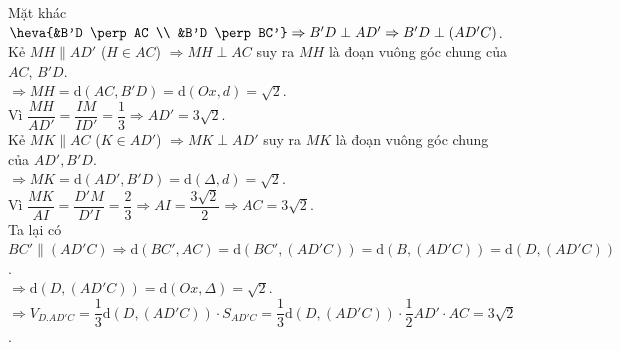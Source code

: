 \begin{ex}
{		Mặt khác $\heva{&B'D \perp AC \\ &B'D \perp BC'} \Rightarrow B'D \perp AD' \Rightarrow B'D  \perp (AD'C)$.\\
		Kẻ $MH \parallel AD'$ ($H \in AC$) $\Rightarrow MH \perp AC$ suy ra $MH$ là đoạn vuông góc chung của $AC$, $B'D$.\\ $\Rightarrow MH =  \mathrm{d}(AC, B'D) = \mathrm{d}(Ox, d) = \sqrt{2}$.\\
		Vì $\dfrac{MH}{AD'} = \dfrac{IM}{ID'} =  \dfrac{1}{3} \Rightarrow AD' = 3\sqrt{2}$.\\
		Kẻ $MK \parallel AC$  ($K \in AD'$) $\Rightarrow MK \perp AD'$ suy ra $MK$ là đoạn vuông góc chung của $AD', B'D$.\\
		$\Rightarrow MK =  \mathrm{d}(AD', B'D) = \mathrm{d}(\Delta, d) = \sqrt{2}$.\\
		Vì $\dfrac{MK}{AI} = \dfrac{D'M}{D'I} = \dfrac{2}{3} \Rightarrow AI = \dfrac{3\sqrt{2}}{2} \Rightarrow  AC=3\sqrt{2}$.\\
		Ta lại có $BC' \parallel (AD'C) \Rightarrow \mathrm{d}(BC', AC)  = \mathrm{d}\left(BC', (AD'C)\right) = \mathrm{d}\left(B, (AD'C)\right) = \mathrm{d}\left(D, (AD'C)\right)$.\\
		$\Rightarrow \mathrm{d}\left(D,  (AD'C)\right) = \mathrm{d}(Ox, \Delta) = \sqrt{2}$.\\
		$\Rightarrow V_{D.AD'C}  = \dfrac{1}{3}\mathrm{d}\left(D, (AD'C)\right)\cdot S_{AD'C} = \dfrac{1}{3}\mathrm{d}\left(D, ( AD'C)\right)\cdot\dfrac{1}{2}AD'\cdot AC=3\sqrt{2}$.\\
	} 
\end{ex}



